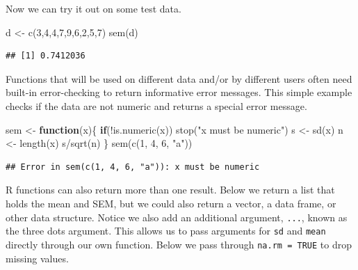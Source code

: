 \documentclass[
]{book}
\newenvironment{Shaded}{\begin{snugshade}}{\end{snugshade}}
\newcommand{\ControlFlowTok}[1]{\textcolor[rgb]{0.13,0.29,0.53}{\textbf{#1}}}
\newcommand{\DecValTok}[1]{\textcolor[rgb]{0.00,0.00,0.81}{#1}}
\newcommand{\FunctionTok}[1]{\textcolor[rgb]{0.00,0.00,0.00}{#1}}
\newcommand{\NormalTok}[1]{#1}
\newcommand{\OtherTok}[1]{\textcolor[rgb]{0.56,0.35,0.01}{#1}}
\newcommand{\SpecialCharTok}[1]{\textcolor[rgb]{0.00,0.00,0.00}{#1}}
\newcommand{\StringTok}[1]{\textcolor[rgb]{0.31,0.60,0.02}{#1}}
\begin{document}
Now we can try it out on some test data.

\begin{Shaded}
\begin{Highlighting}[]
\NormalTok{d }\OtherTok{\textless{}{-}} \FunctionTok{c}\NormalTok{(}\DecValTok{3}\NormalTok{,}\DecValTok{4}\NormalTok{,}\DecValTok{4}\NormalTok{,}\DecValTok{7}\NormalTok{,}\DecValTok{9}\NormalTok{,}\DecValTok{6}\NormalTok{,}\DecValTok{2}\NormalTok{,}\DecValTok{5}\NormalTok{,}\DecValTok{7}\NormalTok{)}
\FunctionTok{sem}\NormalTok{(d)}
\end{Highlighting}
\end{Shaded}

\begin{verbatim}
## [1] 0.7412036
\end{verbatim}

Functions that will be used on different data and/or by different users often need built-in error-checking to return informative error messages. This simple example checks if the data are not numeric and returns a special error message.

\begin{Shaded}
\begin{Highlighting}[]
\NormalTok{sem }\OtherTok{\textless{}{-}} \ControlFlowTok{function}\NormalTok{(x)\{}
  \ControlFlowTok{if}\NormalTok{(}\SpecialCharTok{!}\FunctionTok{is.numeric}\NormalTok{(x)) }\FunctionTok{stop}\NormalTok{(}\StringTok{"x must be numeric"}\NormalTok{)}
\NormalTok{  s }\OtherTok{\textless{}{-}} \FunctionTok{sd}\NormalTok{(x)}
\NormalTok{  n }\OtherTok{\textless{}{-}} \FunctionTok{length}\NormalTok{(x)}
\NormalTok{  s}\SpecialCharTok{/}\FunctionTok{sqrt}\NormalTok{(n)}
\NormalTok{\}}
\FunctionTok{sem}\NormalTok{(}\FunctionTok{c}\NormalTok{(}\DecValTok{1}\NormalTok{, }\DecValTok{4}\NormalTok{, }\DecValTok{6}\NormalTok{, }\StringTok{"a"}\NormalTok{))}
\end{Highlighting}
\end{Shaded}

\begin{verbatim}
## Error in sem(c(1, 4, 6, "a")): x must be numeric
\end{verbatim}

R functions can also return more than one result. Below we return a list that holds the mean and SEM, but we could also return a vector, a data frame, or other data structure. Notice we also add an additional argument, \texttt{...}, known as the three dots argument. This allows us to pass arguments for \texttt{sd} and \texttt{mean} directly through our own function. Below we pass through \texttt{na.rm\ =\ TRUE} to drop missing values.
\end{document}
